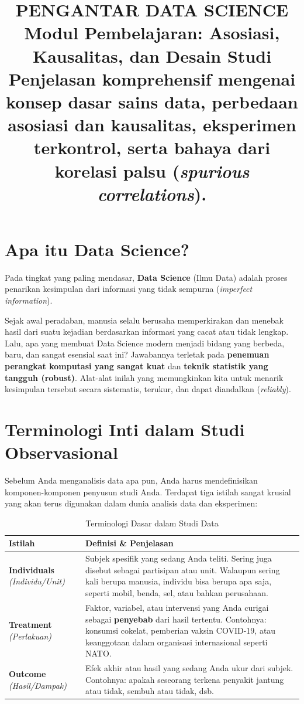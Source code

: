 \documentclass[12pt,a4paper]{article}
\title{
  {\LARGE\bfseries PENGANTAR DATA SCIENCE}\\[0.5em]
  {\large Modul Pembelajaran: Asosiasi, Kausalitas, dan Desain Studi}\\[0.8em]
  {\normalsize Penjelasan komprehensif mengenai konsep dasar sains data, perbedaan asosiasi dan kausalitas, eksperimen terkontrol, serta bahaya dari korelasi palsu (\textit{spurious correlations}).}
}
\author{}
\date{}
\begin{document}
\maketitle
\thispagestyle{fancy}
\tableofcontents
\newpage


\section{Apa itu Data Science?}


Pada tingkat yang paling mendasar, \textbf{Data Science} (Ilmu Data) adalah proses penarikan kesimpulan dari informasi yang tidak sempurna (\textit{imperfect information}). 

Sejak awal peradaban, manusia selalu berusaha memperkirakan dan menebak hasil dari suatu kejadian berdasarkan informasi yang cacat atau tidak lengkap. Lalu, apa yang membuat Data Science modern menjadi bidang yang berbeda, baru, dan sangat esensial saat ini? Jawabannya terletak pada \textbf{penemuan perangkat komputasi yang sangat kuat} dan \textbf{teknik statistik yang tangguh (robust)}. Alat-alat inilah yang memungkinkan kita untuk menarik kesimpulan tersebut secara sistematis, terukur, dan dapat diandalkan (\textit{reliably}).

\newpage
\section{Terminologi Inti dalam Studi Observasional}

Sebelum Anda menganalisis data apa pun, Anda harus mendefinisikan komponen-komponen penyusun studi Anda. Terdapat tiga istilah sangat krusial yang akan terus digunakan dalam dunia analisis data dan eksperimen:

\begin{table}[h]
\centering
\begin{tabular}{@{}p{3.5cm}p{11cm}@{}}
\toprule
\textbf{Istilah} & \textbf{Definisi \& Penjelasan} \\ \midrule
\textbf{Individuals} \newline \textit{(Individu/Unit)} & Subjek spesifik yang sedang Anda teliti. Sering juga disebut sebagai partisipan atau unit. Walaupun sering kali berupa manusia, individu bisa berupa apa saja, seperti mobil, benda, sel, atau bahkan perusahaan. \\ \addlinespace
\textbf{Treatment} \newline \textit{(Perlakuan)} & Faktor, variabel, atau intervensi yang Anda curigai sebagai \textbf{penyebab} dari hasil tertentu. Contohnya: konsumsi cokelat, pemberian vaksin COVID-19, atau keanggotaan dalam organisasi internasional seperti NATO. \\ \addlinespace
\textbf{Outcome} \newline \textit{(Hasil/Dampak)} & Efek akhir atau hasil yang sedang Anda ukur dari subjek. Contohnya: apakah seseorang terkena penyakit jantung atau tidak, sembuh atau tidak, dsb. \\ \bottomrule
\end{tabular}
\caption{Terminologi Dasar dalam Studi Data}
\end{table}
\end{document}
